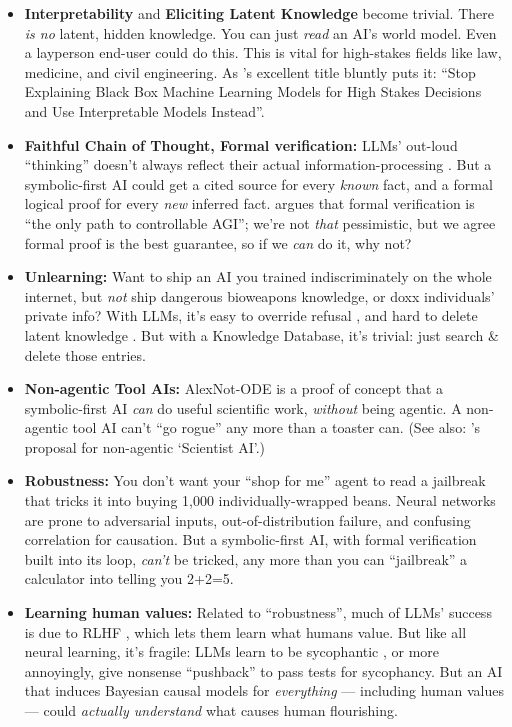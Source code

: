 \documentclass[11pt]{article}
\begin{document}
\begin{itemize}
    \item \textbf{Interpretability} and \textbf{Eliciting Latent Knowledge} \citep{elk} become trivial. There \textit{is no} latent, hidden knowledge. You can just \textit{read} an AI’s world model. Even a layperson end-user could do this. This is vital for high-stakes fields like law, medicine, and civil engineering. As \citet{rudin_stop_explaining}'s excellent title bluntly puts it: ``Stop Explaining Black Box Machine Learning Models for High Stakes Decisions and Use Interpretable Models Instead''.
    \item \textbf{Faithful Chain of Thought, Formal verification:} LLMs’ out-loud ``thinking'' doesn’t always reflect their actual information-processing \citep{turpin_unfaithful_cot}. But a symbolic-first AI could get a cited source for every \textit{known} fact, and a formal logical proof for every \textit{new} inferred fact. \citet{tegmark_provably_safe} argues that formal verification is ``the only path to controllable AGI''; we're not \textit{that} pessimistic, but we agree formal proof is the best guarantee, so if we \textit{can} do it, why not?
    \item \textbf{Unlearning:} Want to ship an AI you trained indiscriminately on the whole internet, but \textit{not} ship dangerous bioweapons knowledge, or doxx individuals’ private info? With LLMs, it’s easy to override refusal \citep{gcg_attack,refusal_direction}, and hard to delete latent knowledge \citep{lucki_unlearning}. But with a Knowledge Database, it’s trivial: just search \& delete those entries.
    \item \textbf{Non-agentic Tool AIs:} AlexNot-ODE is a proof of concept that a symbolic-first AI \textit{can} do useful scientific work, \textit{without} being agentic. A non-agentic tool AI can’t “go rogue” any more than a toaster can. (See also: \citet{bengio_scientist_ai}'s proposal for non-agentic `Scientist AI'.)
    \item \textbf{Robustness:} You don’t want your “shop for me” agent to read a jailbreak that tricks it into buying 1,000 individually-wrapped beans. Neural networks are prone to adversarial inputs, out-of-distribution failure, and confusing correlation for causation. But a symbolic-first AI, with formal verification built into its loop, \textit{can’t} be tricked, any more than you can “jailbreak” a calculator into telling you 2+2=5.
    \item \textbf{Learning human values:} Related to “robustness”, much of LLMs’ success is due to RLHF \citep{rlhf,instructgpt}, which lets them learn what humans value. But like all neural learning, it’s fragile: LLMs learn to be sycophantic \citep{sycophancy}, or more annoyingly, give nonsense “pushback” to pass tests for sycophancy. But an AI that induces Bayesian causal models for \textit{everything} — including human values — could \textit{actually understand} what causes human flourishing. \citep{inverse_rl,cirl}
\end{itemize}
\end{document}
